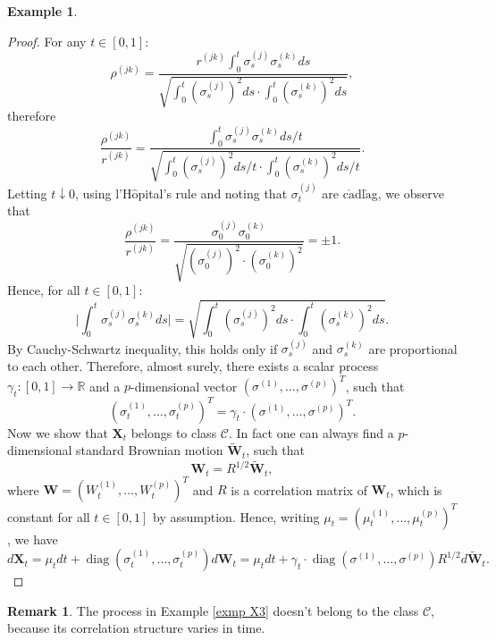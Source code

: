 \documentclass[a4paper,11pt]{article}
\theoremstyle{plain}
\theoremstyle{definition}
\newtheorem{exmp}[thm]{Example}
\newtheorem{rmrk}[thm]{Remark}
\newcommand{\MR}{\mathbb{R}}
\newcommand{\diag}{\operatorname{diag}}
\begin{document}
\begin{exmp}
    		\begin{proof}
    			For any $t \in [0, 1]$: 
    			\[ \rho^{(jk)} = \frac{r^{(jk)} \int_{0}^{t} \sigma_s^{(j)}\sigma_s^{(k)} ds }{\sqrt{\int_{0}^{t} (\sigma_s^{(j)})^2 ds \cdot \int_{0}^{t} (\sigma_s^{(k)})^2 ds}}, \]
    			therefore
    			\[ \frac{\rho^{(jk)}}{r^{(jk)}} = \frac{\int_{0}^{t} \sigma_s^{(j)}\sigma_s^{(k)} ds/t }{\sqrt{\int_{0}^{t} (\sigma_s^{(j)})^2 ds/t \cdot \int_{0}^{t} (\sigma_s^{(k)})^2 ds/t}}. \]
    			Letting $t \downarrow 0$, using l'H$\hat{\text{o}}$pital's rule and noting that $\sigma_t^{(j)}$ are c$\grave{\text{a}}$dl$\grave{\text{a}}$g, we observe that
    			\[ \frac{\rho^{(jk)}}{r^{(jk)}} = \frac{\sigma_0^{(j)}\sigma_0^{(k)}}{ \sqrt{  (\sigma_0^{(j)})^2 \cdot (\sigma_0^{(k)})^2 }} = \pm 1. \]
    			Hence, for all $t \in [0, 1]$:
    			\[ \bigg| \int_{0}^{t}\sigma_s^{(j)}\sigma_s^{(k)} ds \bigg| = \sqrt{\int_{0}^{t} (\sigma_s^{(j)})^2 ds \cdot \int_{0}^{t} (\sigma_s^{(k)})^2 ds} . \]
    			By Cauchy-Schwartz inequality, this holds only if $\sigma_s^{(j)}$ and $\sigma_s^{(k)}$ are proportional to each other. Therefore, almost surely, there exists a scalar process $\gamma_t : [0, 1] \rightarrow \MR$ and a $p$-dimensional vector $(\sigma^{(1)}, \dots, \sigma^{(p)})^T$, such that
    			\[ (\sigma_t^{(1)}, \dots, \sigma_t^{(p)})^T = \gamma_t \cdot (\sigma^{(1)}, \dots, \sigma^{(p)})^T. \]
    			Now we show that $\mathbf{X}_t$ belongs to class $\mathcal{C}$. In fact one can always find a $p$-dimensional standard Brownian motion $\widetilde{\mathbf{W}}_t$, such that 
    			\[ \mathbf{W}_t = R^{1/2}\widetilde{\mathbf{W}}_t, \]
    			where $\mathbf{W} = (W_t^{(1)}, \dots, W_t^{(p)})^T$ and $R$ is a correlation matrix of $\mathbf{W}_t$, which is constant for all $t \in [0, 1]$ by assumption. Hence, writing $\mu_t = (\mu_t^{(1)}, \dots, \mu_t^{(p)})^T$, we have
    			\[ d\mathbf{X}_t = \mu_t dt + \diag(\sigma_t^{(1)}, \dots, \sigma_t^{(p)}) d\mathbf{W}_t = \mu_t dt +\gamma_t \cdot \diag(\sigma^{(1)}, \dots, \sigma^{(p)}) R^{1/2} d\widetilde{\mathbf{W}}_t. \]
    		\end{proof}
    \end{exmp}
    
    \begin{rmrk}
    	The process in Example \ref{exmp X3} doesn't belong to the class $\mathcal{C}$, because its correlation structure varies in time.
    \end{rmrk}
    		
\end{document}
